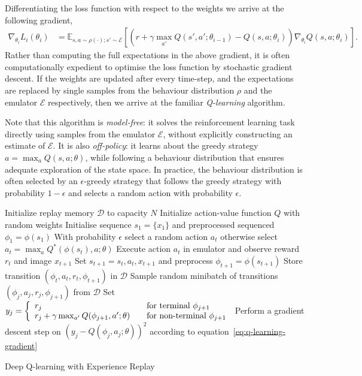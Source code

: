 \documentclass[a4paper, 11pt]{article}
\begin{document}
Differentiating the loss function with respect to the weights we arrive at the following gradient,
%
\begin{align}
\nabla_{\theta_i} L_i\left(\theta_i\right) &= \mathbb{E}_{s,a \sim \rho(\cdot); s' \sim \mathcal{E}} \left[ \left( r + \gamma \max_{a'} Q(s', a'; \theta_{i-1}) - Q(s,a ; \theta_i ) \right) \nabla_{\theta_i} Q(s,a;\theta_{i}) \right] .
\label{eq:q-learning-gradient}
\end{align}
%
Rather than computing the full expectations in the above gradient, it is often computationally expedient to optimise the loss function by stochastic gradient descent. If the weights are updated after every time-step, and the expectations are replaced by single samples from the behaviour distribution $\rho$ and the emulator $\mathcal{E}$ respectively, then we arrive at the familiar \emph{Q-learning} algorithm. 

Note that this algorithm is \emph{model-free}: it solves the reinforcement learning task directly using samples from the emulator $\mathcal{E}$, without explicitly constructing an estimate of $\mathcal{E}$. It is also \emph{off-policy}: it learns about the greedy strategy $a = \max_{a} Q(s,a;\theta)$, while following a behaviour distribution that ensures adequate exploration of the state space. In practice, the behaviour distribution is often selected by an $\epsilon$-greedy strategy that follows the greedy strategy with probability $1 - \epsilon$ and selects a random action with probability $\epsilon$.

\begin{algorithm}[ht]
\begin{algorithmic}
\State Initialize replay memory $\mathcal{D}$ to capacity $N$
\State Initialize action-value function $Q$ with random weights
\State Initialise sequence $s_1 = \{x_1\}$ and preprocessed sequenced $\phi_1 = \phi(s_1)$
	\State With probability $\epsilon$ select a random action $a_t$
	\State otherwise select $a_t = \max_{a} Q^*(\phi(s_t), a; \theta)$
	\State Execute action $a_t$ in emulator and observe reward $r_t$ and image $x_{t+1}$
	\State Set $s_{t+1} = s_t,a_t,x_{t+1}$ and preprocess $\phi_{t+1} = \phi(s_{t+1})$
	\State Store transition $\left(\phi_t,a_t,r_t,\phi_{t+1}\right)$ in $\mathcal{D}$
	\State Sample random minibatch of transitions $\left(\phi_j,a_j,r_j,\phi_{j+1}\right)$ from $\mathcal{D}$
	\State Set
	$y_j =
    \left\{
    \begin{array}{l l}
      r_j  \quad & \text{for terminal } \phi_{j+1}\\
      r_j + \gamma \max_{a'} Q(\phi_{j+1}, a'; \theta) \quad & \text{for non-terminal } \phi_{j+1}
    \end{array} \right.$
	\State Perform a gradient descent step on $\left(y_j - Q(\phi_j, a_j; \theta) \right)^2$ 
	according to equation~\ref{eq:q-learning-gradient}
\EndFor
\EndFor
\end{algorithmic}
\caption{Deep Q-learning with Experience Replay}
\label{alg}
\end{algorithm}
\newpage
\end{document}

